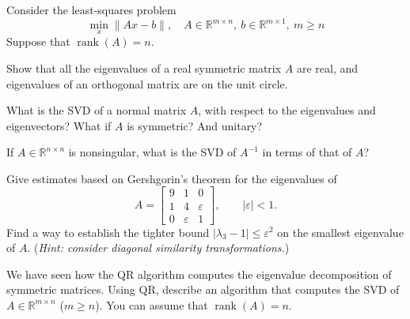 \documentclass[answers]{exam}
\begin{document}
\begin{questions}
\question%
Consider the least-squares problem \[
	\min _{x}\|A x-b\|, \quad A \in \mathbb{R}^{m \times n},\ b \in \mathbb{R}^{m \times 1},\ m \geq n\tag{$\star$}
\] Suppose that $\operatorname{rank}(A)=n$.



\question%
Show that all the eigenvalues of a real symmetric matrix $A$ are real, and eigenvalues of an orthogonal matrix are on the unit circle.



\question%
What is the SVD of a normal matrix $A$, with respect to the eigenvalues and eigenvectors? What if $A$ is symmetric? And unitary?



\question%
If $A \in \mathbb{R}^{n \times n}$ is nonsingular, what is the SVD of $A^{-1}$ in terms of that of $A$?



\question%
Give estimates based on Gershgorin's theorem for the eigenvalues of \[
	A=\begin{bmatrix}
		9 & 1 & 0 \\
		1 & 4 & \varepsilon \\
		0 & \varepsilon & 1
	\end{bmatrix}, \qquad|\varepsilon|<1.
\] Find a way to establish the tighter bound $|\lambda_{3}-1| \leq \varepsilon^{2}$ on the smallest eigenvalue of $A$. (\emph{Hint: consider diagonal similarity transformations.})



\question%
We have seen how the QR algorithm computes the eigenvalue decomposition of symmetric matrices. Using QR, describe an algorithm that computes the SVD of $A \in \mathbb{R}^{m \times n}$ ($m \geq n$). You can assume that $\operatorname{rank}(A)=n$.




\end{questions}
\end{document}
